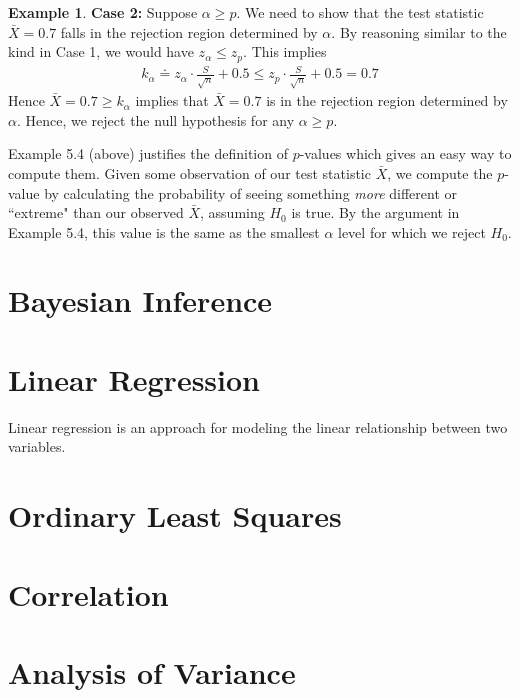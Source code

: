 \documentclass{tufte-book}
\theoremstyle{definition}
\numberwithin{theorem}{section}
\numberwithin{definition}{section}
\numberwithin{lemma}{section}
\numberwithin{corollary}{section}
\numberwithin{proposition}{section}
\numberwithin{remark}{section}
\numberwithin{claim}{section}
\numberwithin{observation}{section}
\numberwithin{fact}{section}
\numberwithin{assumption}{section}
\newtheorem{example}[theorem]{Example}
\numberwithin{example}{section}
\numberwithin{exercise}{section}
\begin{document}
\begin{example}
\textbf{Case 2:} Suppose $\alpha \geq p$. We need to show that the test statistic $\bar{X} = 0.7$ falls in the rejection region determined by $\alpha$. By reasoning similar to the kind in Case 1, we would have $z_{\alpha} \leq z_{p}$. This implies
\begin{align*}
k_{\alpha} \doteq z_{\alpha} \cdot \frac{S}{\sqrt{n}} + 0.5 \leq z_{p} \cdot \frac{S}{\sqrt{n}} + 0.5 = 0.7
\end{align*}
Hence $\bar{X} = 0.7 \geq k_{\alpha}$ implies that $\bar{X} = 0.7$ is in the rejection region determined by $\alpha$. Hence, we reject the null hypothesis for any $\alpha \geq p$.
%
\end{example}
Example 5.4 (above) justifies the definition of $p$-values which gives an easy way to compute them. Given some observation of our test statistic $\bar{X}$, we compute the $p$-value by calculating the probability of seeing something \textit{more} different or ``extreme" than our observed $\bar{X}$, assuming $H_0$ is true. By the argument in Example 5.4, this value is the same as the smallest $\alpha$ level for which we reject $H_0$.


\chapter{Bayesian Inference}


\chapter*{Linear Regression}
Linear regression is an approach for modeling the linear relationship between two variables.


\chapter{Ordinary Least Squares}


\chapter{Correlation}


\chapter{Analysis of Variance}
\end{document}
